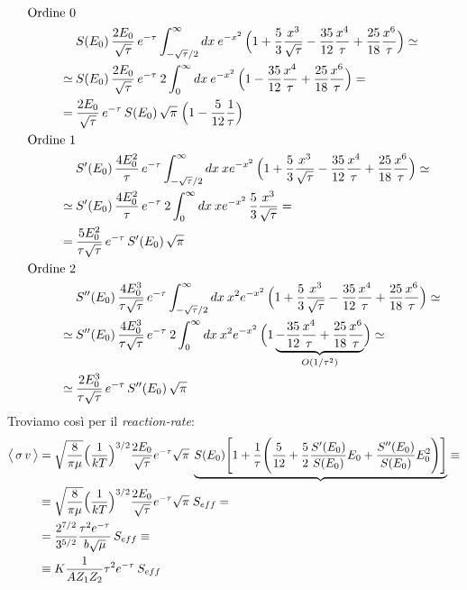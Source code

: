 \begin{displaymath}
\begin{aligned}
\text{Ordine 0}& \\
&S(E_0) \, \frac{2E_0}{\sqrt{\tau}}\,e^{-\tau} \int_{-\sqrt{\tau}/2}^\infty dx \:  e^{-x^2} \, \Bigl ( 1+\frac{5}{3} \frac{x^3}{\sqrt{\tau}} - \frac{35}{12}\frac{x^4}{\tau} + \frac{25}{18} \frac{x^6}{\tau} \Bigr )\simeq \\
\simeq\: &S(E_0) \, \frac{2E_0}{\sqrt{\tau}}\,e^{-\tau} \: 2\int_{0}^\infty dx \:  e^{-x^2} \, \Bigl ( 1- \frac{35}{12}\frac{x^4}{\tau} + \frac{25}{18} \frac{x^6}{\tau} \Bigr ) = \\
= \:&\frac{2E_0}{\sqrt{\tau}}\,e^{-\tau} \,S(E_0) \,\sqrt{\pi}\; \Bigl ( 1-\frac{5}{12}\frac{1}{\tau} \Bigr ) \\
\text{Ordine 1}& \\
&S'(E_0) \, \frac{4E_0^2}{\tau}\,e^{-\tau} \int_{-\sqrt{\tau}/2}^\infty dx \: x e^{-x^2} \, \Bigl ( 1+\frac{5}{3} \frac{x^3}{\sqrt{\tau}} - \frac{35}{12}\frac{x^4}{\tau} + \frac{25}{18} \frac{x^6}{\tau} \Bigr )\simeq \\
\simeq \:&S'(E_0) \, \frac{4E_0^2}{\tau}\,e^{-\tau} \:2\int_{0}^\infty dx \: x e^{-x^2} \, \frac{5}{3} \frac{x^3}{\sqrt{\tau}}= \\
=\:&\frac{5E_0^2}{\tau\sqrt{\tau}}\,e^{-\tau} \, S'(E_0) \,\sqrt{\pi} \\
\text{Ordine 2}& \\
&S''(E_0) \, \frac{4E_0^3}{\tau\sqrt{\tau}}\,e^{-\tau} \int_{-\sqrt{\tau}/2}^\infty dx \: x^2 e^{-x^2} \, \Bigl ( 1+\frac{5}{3} \frac{x^3}{\sqrt{\tau}} - \frac{35}{12}\frac{x^4}{\tau} + \frac{25}{18} \frac{x^6}{\tau} \Bigr )\simeq \\
\simeq\: &S''(E_0) \, \frac{4E_0^3}{\tau\sqrt{\tau}}\,e^{-\tau}\: 2 \int_{0}^\infty dx \: x^2 e^{-x^2} \, \Bigl ( 1 \underbrace{- \frac{35}{12}\frac{x^4}{\tau} + \frac{25}{18} \frac{x^6}{\tau}}_{O(1/\tau^2)} \Bigr )\simeq \\
\simeq \:&\frac{2E_0^3}{\tau\sqrt{\tau}}\,e^{-\tau}\,S''(E_0) \,\sqrt{\pi}
\end{aligned}
\end{displaymath}
Troviamo così per il \textit{reaction-rate}:
\begin{displaymath}
\begin{aligned}
\bigl\langle\, \sigma\,v \, \bigr\rangle &=  \sqrt{\frac{8}{\pi\mu}} \Bigl ( \frac{1}{kT} \Bigr )^{3/2} \frac{2E_0}{\sqrt{\tau}}e^{-\tau}\sqrt{\pi}\: \underbrace{ S(E_0) \Biggl [ 1+\frac{1}{\tau} \Biggl ( \frac{5}{12} +\frac{5}{2} \frac{S'(E_0)}{S(E_0)}E_0 + \frac{S''(E_0)}{S(E_0)}E_0^2 \Biggr ) \Biggr ] } \equiv\\
&\equiv \sqrt{\frac{8}{\pi\mu}} \Bigl ( \frac{1}{kT} \Bigr )^{3/2} \frac{2E_0}{\sqrt{\tau}}e^{-\tau}\sqrt{\pi}\; S_{eff} =\\
&= \frac{2^{7/2}}{3^{5/2}} \frac{\tau^2 e^{-\tau}}{b\sqrt{\mu}}\, S_{eff} \equiv\\
&\equiv K \frac{1}{AZ_1Z_2} \tau^2 e^{-\tau} \: S_{eff}
\end{aligned}
\end{displaymath}
